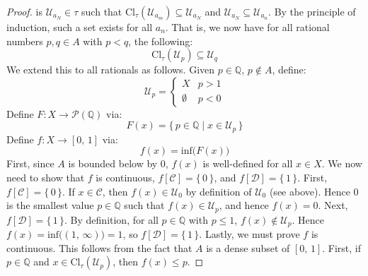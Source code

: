 \documentclass{article}
\theoremstyle{plain}
\begin{document}
\begin{proof}
            is $\mathcal{U}_{a_{N}}\in\tau$ such that
            $\textrm{Cl}_{\tau}(\mathcal{U}_{a_{m}})\subseteq\mathcal{U}_{a_{N}}$
            and $\mathcal{U}_{a_{N}}\subseteq\mathcal{U}_{a_{n}}$. By the
            principle of induction, such a set exists for all $a_{n}$. That is,
            we now have for all rational numbers $p,q\in{A}$ with $p<q$, the
            following:
            \begin{equation}
                \textrm{Cl}_{\tau}(\mathcal{U}_{p})\subseteq\mathcal{U}_{q}
            \end{equation}
            We extend this to all rationals as follows. Given
            $p\in\mathbb{Q}$, $p\not\in{A}$, define:
            \begin{equation}
                \mathcal{U}_{p}=
                \begin{cases}
                    X&p>1\\
                    \emptyset&p<0
                \end{cases}
            \end{equation}
            Define $F:X\rightarrow\mathcal{P}(\mathbb{Q})$ via:
            \begin{equation}
                F(x)=\{\,p\in\mathbb{Q}\;|\;x\in\mathcal{U}_{p}\,\}
            \end{equation}
            Define $f:X\rightarrow[0,\,1]$ via:
            \begin{equation}
                f(x)=\textrm{inf}\big(F(x)\big)
            \end{equation}
            First, since $A$ is bounded below by $0$, $f(x)$ is well-defined
            for all $x\in{X}$. We now need to show that $f$ is continuous,
            $f[\mathcal{C}]=\{\,0\,\}$, and $f[\mathcal{D}]=\{\,1\,\}$.
            First, $f[\mathcal{C}]=\{\,0\,\}$. If $x\in\mathcal{C}$, then
            $f(x)\in\mathcal{U}_{0}$ by definition of $\mathcal{U}_{0}$ (see
            above). Hence $0$ is the smallest value $p\in\mathbb{Q}$ such that
            $f(x)\in\mathcal{U}_{p}$, and hence $f(x)=0$. Next,
            $f[\mathcal{D}]=\{\,1\,\}$. By definition, for all $p\in\mathbb{Q}$
            with $p\leq{1}$, $f(x)\notin\mathcal{U}_{p}$. Hence
            $f(x)=\textrm{inf}\big((1,\,\infty)\big)=1$, so
            $f[\mathcal{D}]=\{\,1\,\}$. Lastly, we must prove $f$ is continuous.
            This follows from the fact that $A$ is a dense subset of $[0,\,1]$.
            First, if $p\in\mathbb{Q}$ and
            $x\in\textrm{Cl}_{\tau}(\mathcal{U}_{p})$, then $f(x)\leq{p}$.

\end{proof}
\end{document}
